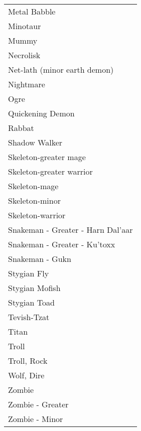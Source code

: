 \documentclass[twoside]{book}
\begin{document}
\begin{longtable}{p{1.25in}}
      \raggedright  Metal Babble\tabularnewline
      \raggedright  Minotaur\tabularnewline
      \raggedright  Mummy\tabularnewline
      \raggedright  Necrolisk\tabularnewline
      \raggedright  Net-lath (minor earth demon)\tabularnewline
      \raggedright  Nightmare\tabularnewline
      \raggedright  Ogre\tabularnewline
      \raggedright  Quickening Demon\tabularnewline
      \raggedright  Rabbat\tabularnewline
      \raggedright  Shadow Walker\tabularnewline
      \raggedright  Skeleton-greater mage\tabularnewline
      \raggedright  Skeleton-greater warrior\tabularnewline
      \raggedright  Skeleton-mage\tabularnewline
      \raggedright  Skeleton-minor\tabularnewline
      \raggedright  Skeleton-warrior\tabularnewline
      \raggedright  Snakeman - Greater - Harn
           Dal'aar\tabularnewline
      \raggedright  Snakeman - Greater -
           Ku'toxx\tabularnewline
      \raggedright  Snakeman - Gukn\tabularnewline
      \raggedright  Stygian Fly\tabularnewline
      \raggedright  Stygian Mofish\tabularnewline
      \raggedright  Stygian Toad\tabularnewline
      \raggedright  Tevish-Tzat\tabularnewline
      \raggedright  Titan\tabularnewline
      \raggedright  Troll\tabularnewline
      \raggedright  Troll, Rock\tabularnewline
      \raggedright  Wolf, Dire\tabularnewline
      \raggedright  Zombie\tabularnewline
      \raggedright  Zombie - Greater\tabularnewline
      \raggedright  Zombie - Minor\tabularnewline
      
\end{longtable}
    
\end{document}
